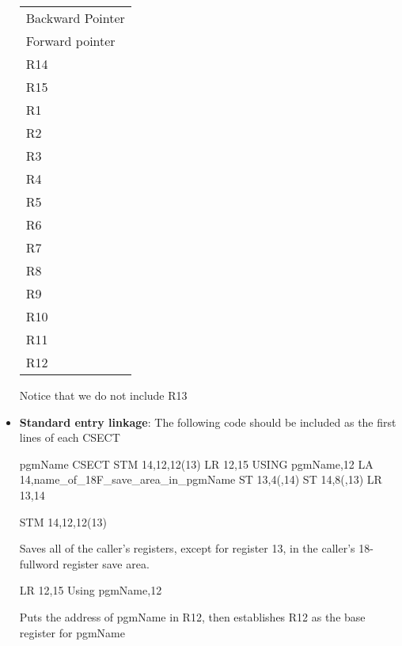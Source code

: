 \documentclass{report}
\begin{document}
\begin{itemize}
\begin{center}
\begin{tabular}{p{4cm}}
                    Backward Pointer \\
                    Forward pointer \\
                    R14 \\
                    R15 \\
                    R1\\
                    R2\\
                    R3\\
                    R4\\
                    R5\\
                    R6\\
                    R7\\
                    R8\\
                    R9\\
                    R10\\
                    R11\\
                    R12
                \end{tabular}
            \end{center}
            \bigbreak \noindent 
            Notice that we do not include R13
        \item \textbf{Standard entry linkage}: The following code should be included as the first lines of each CSECT
            \bigbreak \noindent 
            \begin{cppcode}
            pgmName    CSECT
                       STM   14,12,12(13)
                       LR    12,15
                       USING pgmName,12
                       LA    14,name_of_18F_save_area_in_pgmName
                       ST    13,4(,14)
                       ST    14,8(,13)
                       LR    13,14
            \end{cppcode}
            \bigbreak \noindent 
            \begin{cppcode}
            STM   14,12,12(13) 
            \end{cppcode}
            \bigbreak \noindent 
            Saves all of the caller's registers, except for register 13, in the caller's 18-fullword register save area.
            \bigbreak \noindent 
            \begin{cppcode}
            LR    12,15
            Using pgmName,12
            \end{cppcode}
            Puts the address of pgmName in R12, then establishes R12 as the base register for pgmName
            \bigbreak \noindent 

\end{itemize}
\end{document}
